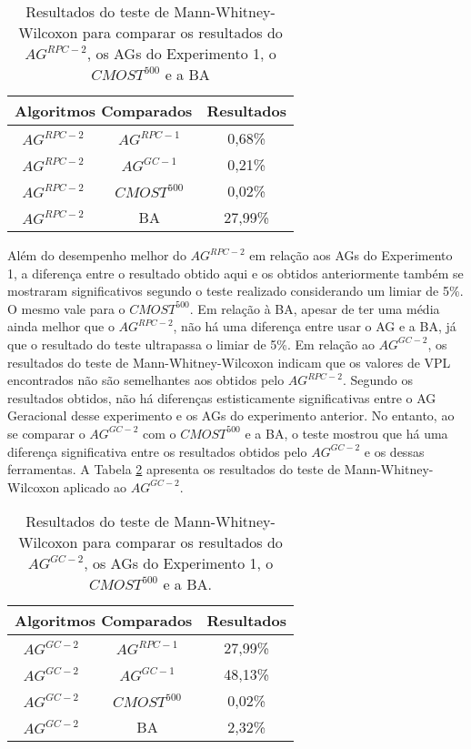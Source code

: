 \begin{table}[H]
\centering
\caption{Resultados do teste de Mann-Whitney-Wilcoxon para comparar os resultados do $AG^{RPC-2}$, os AGs do Experimento 1, o $CMOST^{500}$ e a BA}
\label{tab:mw2_1}
\begin{tabular}{|c|c|c|}
\hline
\multicolumn{2}{|c|}{Algoritmos Comparados} & Resultados \\ \hline
$AG^{RPC-2}$ & $AG^{RPC-1}$ & 0,68\% \\ \hline
$AG^{RPC-2}$ & $AG^{GC-1}$ & 0,21\% \\ \hline
$AG^{RPC-2}$ & $CMOST^{500}$ & 0,02\% \\ \hline
$AG^{RPC-2}$ & BA & 27,99\% \\ \hline
\end{tabular}
\end{table}

Além do desempenho melhor do $AG^{RPC-2}$ em relação aos AGs do Experimento 1, a diferença entre o resultado obtido aqui e os obtidos anteriormente também se mostraram significativos segundo o teste realizado considerando um limiar de 5\%. O mesmo vale para o $CMOST^{500}$. Em relação à BA, apesar de ter uma média ainda melhor que o $AG^{RPC-2}$, não há uma diferença entre usar o AG e a BA, já que o resultado do teste ultrapassa o limiar de 5\%. Em relação ao $AG^{GC-2}$, os resultados do teste de Mann-Whitney-Wilcoxon indicam que os valores de VPL encontrados não são semelhantes aos obtidos pelo $AG^{RPC-2}$. Segundo os resultados obtidos, não há diferenças estisticamente significativas entre o AG Geracional desse experimento e os AGs do experimento anterior. No entanto, ao se comparar o $AG^{GC-2}$ com o $CMOST^{500}$ e a BA, o teste mostrou que há uma diferença significativa entre os resultados obtidos pelo $AG^{GC-2}$ e os dessas ferramentas. A Tabela \ref{tab:mw2_2} apresenta os resultados do teste de Mann-Whitney-Wilcoxon aplicado ao $AG^{GC-2}$.

\begin{table}[htb]
\centering
\caption{Resultados do teste de Mann-Whitney-Wilcoxon para comparar os resultados do $AG^{GC-2}$, os AGs do Experimento 1, o $CMOST^{500}$ e a BA.}
\label{tab:mw2_2}
\begin{tabular}{|c|c|c|}
\hline
\multicolumn{2}{|c|}{Algoritmos Comparados} & Resultados \\ \hline
$AG^{GC-2}$ & $AG^{RPC-1}$ & 27,99\% \\ \hline
$AG^{GC-2}$ & $AG^{GC-1}$ & 48,13\% \\ \hline
$AG^{GC-2}$ & $CMOST^{500}$ & 0,02\% \\ \hline
$AG^{GC-2}$ & BA & 2,32\% \\ \hline

\end{tabular}
\end{table}

